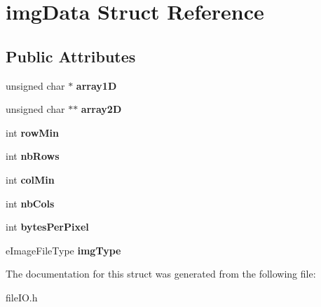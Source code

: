\hypertarget{structimg_data}{}\section{img\+Data Struct Reference}
\label{structimg_data}
\subsection*{Public Attributes}
\begin{DoxyCompactItemize}
\item 
unsigned char $\ast$ {\bfseries array1D}\hypertarget{structimg_data_a0e8abc35ea0d743c71a9ef3e6bcda54a}{}\label{structimg_data_a0e8abc35ea0d743c71a9ef3e6bcda54a}

\item 
unsigned char $\ast$$\ast$ {\bfseries array2D}\hypertarget{structimg_data_aeb4ac50c5551e47d84a1f766a1d36c56}{}\label{structimg_data_aeb4ac50c5551e47d84a1f766a1d36c56}

\item 
int {\bfseries row\+Min}\hypertarget{structimg_data_a010df97339f46151328afc61ed2074bd}{}\label{structimg_data_a010df97339f46151328afc61ed2074bd}

\item 
int {\bfseries nb\+Rows}\hypertarget{structimg_data_a7e683fabd433c2a95e8140b67f4bc0a2}{}\label{structimg_data_a7e683fabd433c2a95e8140b67f4bc0a2}

\item 
int {\bfseries col\+Min}\hypertarget{structimg_data_acd647ef07b6f0b1c2188b1236a3d1167}{}\label{structimg_data_acd647ef07b6f0b1c2188b1236a3d1167}

\item 
int {\bfseries nb\+Cols}\hypertarget{structimg_data_a09bf759c70620cc6086e7d89815cfe91}{}\label{structimg_data_a09bf759c70620cc6086e7d89815cfe91}

\item 
int {\bfseries bytes\+Per\+Pixel}\hypertarget{structimg_data_a6354857dd1f2b700839d8179fc45ce97}{}\label{structimg_data_a6354857dd1f2b700839d8179fc45ce97}

\item 
e\+Image\+File\+Type {\bfseries img\+Type}\hypertarget{structimg_data_a60699b4c883db19db9df63e1558c5a7e}{}\label{structimg_data_a60699b4c883db19db9df63e1558c5a7e}

\end{DoxyCompactItemize}


The documentation for this struct was generated from the following file\+:\begin{DoxyCompactItemize}
\item 
file\+I\+O.\+h\end{DoxyCompactItemize}
